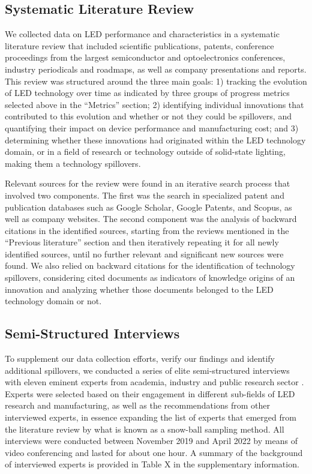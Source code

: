 \documentclass[twoside,twocolumn,9pt]{article}
\begin{document}
\subsection{Systematic Literature Review}

We collected data on LED performance and characteristics in a systematic literature review that included scientific publications, patents, conference proceedings from the largest semiconductor and optoelectronics conferences, industry periodicals and roadmaps, as well as company presentations and reports. This review was structured around the three main goals: 1) tracking the evolution of LED technology over time as indicated by three groups of progress metrics selected above in the “Metrics” section; 2) identifying individual innovations that contributed to this evolution and whether or not they could be spillovers, and quantifying their impact on device performance and manufacturing cost; and 3) determining whether these innovations had originated within the LED technology domain, or in a field of research or technology outside of solid-state lighting, making them a technology spillovers. 

Relevant  sources for the review were found in an iterative search process that involved two components. The first was the search in specialized patent and publication databases such as Google Scholar, Google Patents, and Scopus, as well as company websites. The second component was the analysis of backward citations in the identified sources, starting from the reviews mentioned in the “Previous literature” section and then iteratively repeating it for all newly identified sources, until no further relevant and significant new sources were found. We also relied on backward citations for the identification of technology spillovers, considering cited documents as indicators of knowledge origins of an innovation and analyzing whether those documents belonged to the LED technology domain or not.

\subsection{Semi-Structured Interviews}

To supplement our data collection efforts, verify our findings and identify additional spillovers, we conducted a series of elite semi-structured interviews with eleven eminent experts  from academia, industry and public research sector . Experts were selected based on their engagement in  different sub-fields of LED research and manufacturing, as well as the recommendations from other interviewed experts, in essence expanding the list of experts that emerged from the literature review by what is known as a snow-ball sampling method. All interviews were conducted between November 2019 and April 2022 by means of video conferencing and lasted for about one hour. A summary of the background of interviewed experts is provided in Table X in the supplementary information.
\end{document}
